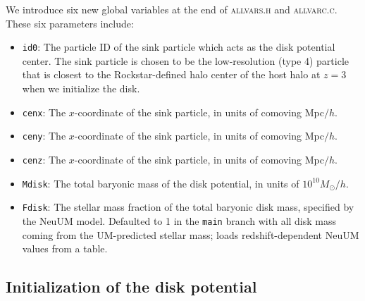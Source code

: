 \documentclass[12pt]{article}
\begin{document}
    We introduce six new global variables at the end of \textsc{allvars.h} and \textsc{allvarc.c}. These six parameters include:
    \begin{itemize}
        \item \texttt{id0}: The particle ID of the sink particle which acts as the disk potential center. The sink particle is chosen to be the low-resolution (type 4) particle that is closest to the Rockstar-defined halo center of the host halo at $z=3$ when we initialize the disk.
        \item \texttt{cenx}: The $x$-coordinate of the sink particle, in units of comoving Mpc$/h$.
        \item \texttt{ceny}: The $x$-coordinate of the sink particle, in units of comoving Mpc$/h$.
        \item \texttt{cenz}: The $x$-coordinate of the sink particle, in units of comoving Mpc$/h$.
        \item \texttt{Mdisk}: The total baryonic mass of the disk potential, in units of $10^{10}M_{\odot} / h$.
        \item \texttt{Fdisk}: The stellar mass fraction of the total baryonic disk mass, specified by the NeuUM model. Defaulted to 1 in the \texttt{main} branch with all disk mass coming from the UM-predicted stellar mass; loads redshift-dependent NeuUM values from a table.
    \end{itemize}

    \subsection{Initialization of the disk potential}
    
\end{document}
